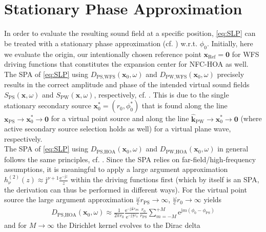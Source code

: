 \documentclass[a4paper, 10pt, twocolumn]{article}
\def\NewL{\\\noindent\hspace*{3mm}}
\begin{document}
\section*{Stationary Phase Approximation}
\label{sec:SPA}
\noindent\hspace*{2mm} In order to evaluate the resulting sound field at a specific position, \eqref{eq:SLP}
can be treated with a stationary phase approximation (cf. \cite[App. B]{FirthaIEEE2018})
w.r.t. $\phi_0$.
%
Initially, here we evaluate the origin, our intentionally chosen reference point $\mathbf{x}_\text{Ref}=\mathbf{0}$
for WFS driving functions that constitutes the expansion center for NFC-HOA as well.
%
%
%
\NewL The SPA of \eqref{eq:SLP} using $D_{\text{PS,WFS}}(\mathbf{x}_0,\omega)$ and
$D_{\text{PW,WFS}}(\mathbf{x}_0,\omega)$ precisely results in the correct amplitude
and phase of the intended virtual sound fields $S_\text{PS}(\mathbf{x},\omega)$
and $S_\text{PW}(\mathbf{x},\omega)$, respectively, cf. \cite{Schultz2019}.
%
This is due to the single stationary secondary source $\mathbf{x}_0^* = (r_0, \phi_0^*)$ 
that is found along the line $\mathbf{x}_\text{PS} \rightarrow  \mathbf{x}_0^* \rightarrow \mathbf{0}$
for a virtual point source and along the line
$\mathbf{\hat{k}}_\text{PW} \rightarrow  \mathbf{x}_0^* \rightarrow \mathbf{0}$ (where
active secondary source selection holds as well) for a virtual plane wave, respectively.
%
%
%
%
%
%
\NewL The SPA of \eqref{eq:SLP} using $D_{\text{PS,HOA}}(\mathbf{x}_0,\omega)$ and
$D_{\text{PW,HOA}}(\mathbf{x}_0,\omega)$ in general follows the same principles, cf. \cite{Schultz2019}.
%
Since the SPA relies on far-field/high-frequency assumptions, it is meaningful to
apply a large argument approximation $h_\nu^{(2)}(z) \approx \mathrm{j}^{\nu+1} \frac{\mathrm{e}^{-\mathrm{j} z}}{z}$
within the driving functions first (which by itself is an SPA, 
the derivation can thus be performed in different ways).
For the virtual point source the large argument approximation 
$\frac{\omega}{\mathrm{c}} r_\text{PS} \rightarrow \infty$, $\frac{\omega}{\mathrm{c}} r_0 \rightarrow \infty$
yields
\begin{align}
D_{\text{PS,HOA}}(\mathbf{x}_0,\omega) \approx
\frac{1}{2 \pi r_0}
\frac
{\mathrm{e}^{-\mathrm{j} \frac{\omega}{\mathrm{c}} r_\text{PS}}}
{\mathrm{e}^{-\mathrm{j} \frac{\omega}{\mathrm{c}} r_0}}
\frac{r_0}{r_\text{PS}}
\sum\limits_{m=-M}^{+M}
\mathrm{e}^{\mathrm{j} m (\phi_0 - \phi_\text{PS})}
\end{align}
and for $M\rightarrow \infty$ the Dirichlet kernel evolves to the Dirac delta
\end{document}
